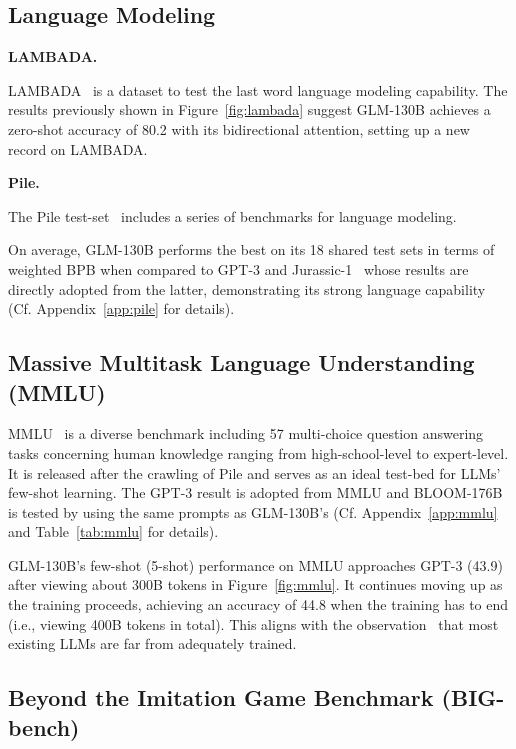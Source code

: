 \subsection{Language Modeling} \label{sec:language_modeling}

\textbf{LAMBADA.}

LAMBADA~\citep{paperno2016lambada} is a dataset to test the last word language modeling capability. The results previously shown in Figure~\ref{fig:lambada} suggest GLM-130B achieves a zero-shot accuracy of 80.2 with its bidirectional attention, setting up a new record on LAMBADA.

\textbf{Pile.} 

The Pile test-set~\citep{gao2020pile} includes a series of benchmarks for language modeling.

On average, GLM-130B performs the best on its 18 shared test sets in terms of weighted BPB when compared to GPT-3 and Jurassic-1~\citep{lieber2021jurassic} whose results are directly adopted from the latter, demonstrating its strong language capability (Cf. Appendix~\ref{app:pile} for details).

\subsection{Massive Multitask Language Understanding (MMLU)} \label{sec:mmlu}

MMLU~\citep{hendrycks2021measuring} is a diverse benchmark including 57 multi-choice question answering tasks concerning human knowledge ranging from high-school-level to expert-level. It is released after the crawling of Pile and serves as an ideal test-bed for LLMs' few-shot learning. The GPT-3 result is adopted from MMLU and BLOOM-176B is tested by using the same prompts as GLM-130B's (Cf. Appendix~\ref{app:mmlu} and Table~\ref{tab:mmlu} for details).

GLM-130B's few-shot (5-shot) performance on MMLU approaches GPT-3 (43.9) after viewing about 300B tokens in Figure~\ref{fig:mmlu}. 
It continues moving up as the training proceeds, achieving an accuracy of 44.8 when the training has to end (i.e., viewing 400B tokens in total). This aligns with the observation~\citep{hoffmann2022training} that most existing LLMs are far from adequately trained. 

\subsection{Beyond the Imitation Game Benchmark (BIG-bench)} \label{sec:big-bench}

